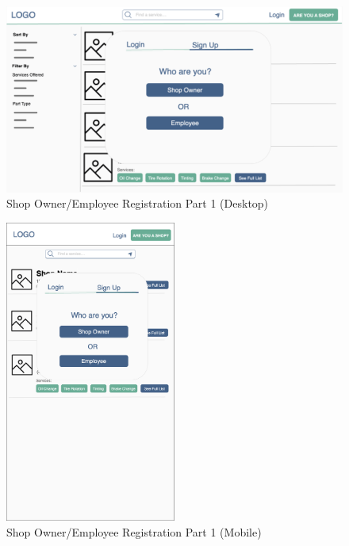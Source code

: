 \documentclass[12pt, titlepage]{article}
\begin{document}
\begin{figure}[H]
	\centering
	\includegraphics[width=\textwidth]{mockups/Shop Sign Up (Desktop).png}
	\caption{Shop Owner/Employee Registration \textemdash{} Part 1 (Desktop)}
\end{figure}

\begin{figure}[H]
	\centering
	\includegraphics[width=0.5\textwidth]{mockups/Shop Sign Up (Mobile).png}
	\caption{Shop Owner/Employee Registration \textemdash{} Part 1 (Mobile)}
\end{figure}
\end{document}
